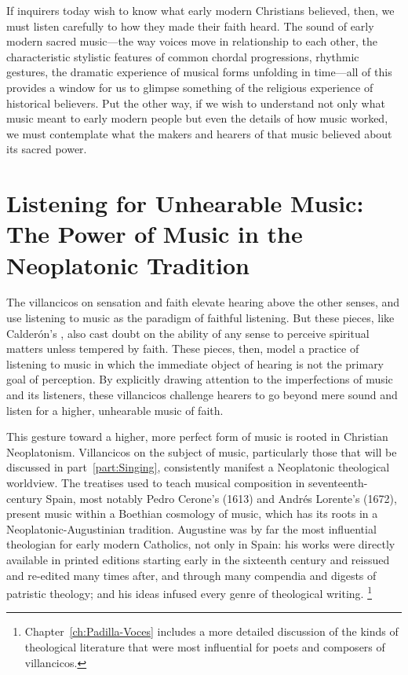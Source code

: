 If inquirers today wish to know what early modern Christians believed, then, we must listen carefully to how they made their faith heard.
The sound of early modern sacred music---the way voices move in relationship to each other, the characteristic stylistic features of common chordal progressions, rhythmic gestures, the dramatic experience of musical forms unfolding in time---all of this provides a window for us to glimpse something of the religious experience of historical believers.
Put the other way, if we wish to understand not only what music meant to early modern people but even the details of how music worked, we must contemplate what the makers and hearers of that music believed about its sacred power. 

\section{%
Listening for Unhearable Music:
The Power of Music in the Neoplatonic Tradition
}

The villancicos on sensation and faith elevate hearing above the other senses, and use listening to music as the paradigm of faithful listening.
But these pieces, like Calderón's , also cast doubt on the ability of any sense to perceive spiritual matters unless tempered by faith.
These pieces, then, model a practice of listening to music in which the immediate object of hearing is not the primary goal of perception.
By explicitly drawing attention to the imperfections of music and its listeners, these villancicos challenge hearers to go beyond mere sound and listen for a higher, unhearable music of faith.

This gesture toward a higher, more perfect form of music is rooted in Christian Neoplatonism.
Villancicos on the subject of music, particularly those that will be discussed in part~\ref{part:Singing}, consistently manifest a Neoplatonic theological worldview.
The treatises used to teach musical composition in seventeenth-century Spain, most notably Pedro Cerone's  (1613) and Andrés Lorente's  (1672), present music within a Boethian cosmology of music, which has its roots in a Neoplatonic-Augustinian tradition.
Augustine was by far the most influential theologian for early modern Catholics, not only in Spain: his works were directly available in printed editions starting early in the sixteenth century and reissued and re-edited many times after, and through many compendia and digests of patristic theology; and his ideas infused every genre of theological writing.%
	\footnote{%
	Chapter~\ref{ch:Padilla-Voces} includes a more detailed discussion of the kinds of theological literature that were most influential for poets and composers of villancicos.
	}


